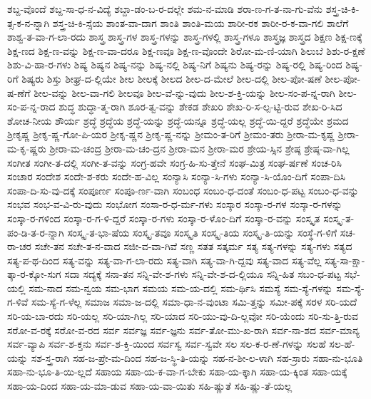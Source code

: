 {ಶಬ್ದ-ವೊಂದೆ
ಶಬ್ದ-ಸಾ-ಧ-ನ-ವಿದ್ಯೆ
ಶಬ್ದಾ-ಡಂ-ಬ-ರ-ದಲ್ಲೇ
ಶಮ-ನ-ಮಾಡಿ
ಶರಾ-ಣ-ಗ-ತ-ನಾ-ಗು-ವೆನು
ಶಸ್ತ್ರ-ಚಿ-ಕಿ-ತ್ಸ-ಕ-ನ-ನ್ನಾಗಿ
ಶಸ್ತ್ರ-ಚಿ-ಕಿ-ಸ್ಸೆಯ
ಶಾಂತ-ವಾ-ದಾಗ
ಶಾಂತಿ
ಶಾಂತಿ-ಮಯ
ಶಾರೀ-ರಕ
ಶಾರೀ-ರ-ಕ-ವಾ-ಗಲಿ
ಶಾಲೆಗೆ
ಶಾಶ್ವ-ತ-ವಾ-ಗ-ಲಾ-ರದು
ಶಾಸ್ತ್ರ
ಶಾಸ್ತ್ರ-ಗಳ
ಶಾಸ್ತ್ರ-ಗಳನ್ನು
ಶಾಸ್ತ್ರ-ಗಳಲ್ಲಿ
ಶಾಸ್ತ್ರ-ಗಳೂ
ಶಾಸ್ತ್ರಜ್ಞ
ಶಾಸ್ತ್ರದ
ಶಿಕ್ಷಣ
ಶಿಕ್ಷ-ಣಕ್ಕೆ
ಶಿಕ್ಷ-ಣದ
ಶಿಕ್ಷ-ಣ-ವನ್ನು
ಶಿಕ್ಷ-ಣ-ವಾ-ದರೂ
ಶಿಕ್ಷ-ಣವೂ
ಶಿಕ್ಷ-ಣ-ವೊಂದೇ
ಶಿರೋ-ಮ-ಣಿ-ಯಾಗಿ
ಶಿಲುಬೆ
ಶಿಶು-ರ-ಕ್ಷಣೆ
ಶಿಶು-ವಿ-ಹಾ-ರ-ಗಳು
ಶಿಷ್ಯ
ಶಿಷ್ಯನ
ಶಿಷ್ಯ-ನನ್ನು
ಶಿಷ್ಯ-ನಲ್ಲಿ
ಶಿಷ್ಯ-ನಿಗೆ
ಶಿಷ್ಯನು
ಶಿಷ್ಯ-ರನ್ನು
ಶಿಷ್ಯ-ರಲ್ಲಿ
ಶಿಷ್ಯ-ರಿಂದ
ಶಿಷ್ಯ-ರಿಗೆ
ಶಿಷ್ಯರು
ಶಿಸ್ತು
ಶೀಘ್ರ-ದ-ಲ್ಲಿಯೇ
ಶೀಲ
ಶೀಲಕ್ಕೆ
ಶೀಲದ
ಶೀಲ-ದ-ಮೇಲೆ
ಶೀಲ-ದಲ್ಲಿ
ಶೀಲ-ಪೋ-ಷಣೆ
ಶೀಲ-ಪೋ-ಷ-ಣೆಗೆ
ಶೀಲ-ವನ್ನು
ಶೀಲ-ವಾ-ಗಲಿ
ಶೀಲವೂ
ಶೀಲ-ವೆ-ನ್ನು-ವುದು
ಶೀಲ-ಶ-ಕ್ತಿ-ಯನ್ನು
ಶೀಲ-ಸಂ-ಪ-ನ್ನ-ರಾಗಿ
ಶೀಲ-ಸಂ-ಪ-ನ್ನ-ರಾದ
ಶುದ್ಧ
ಶುದ್ಧಾ-ತ್ಮ-ರಾಗಿ
ಶೂರ-ತ್ವ-ವನ್ನು
ಶೇಕಡ
ಶೇಖರಿ
ಶೇಖ-ರಿ-ಸ-ಲ್ಪ-ಟ್ಟಿ-ರುವ
ಶೇಖ-ರಿ-ಸಿದ
ಶೋಚ-ನೀಯ
ಶೌರ್ಯ
ಶ್ರದ್ಧೆ
ಶ್ರದ್ಧೆಯ
ಶ್ರದ್ಧೆ-ಯನ್ನು
ಶ್ರದ್ಧೆ-ಯನ್ನೂ
ಶ್ರದ್ಧೆ-ಯಲ್ಲ
ಶ್ರದ್ಧೆ-ಯಿ-ದ್ದರೆ
ಶ್ರದ್ಧೆಯೇ
ಶ್ರಮದ
ಶ್ರೀಕೃಷ್ಣ
ಶ್ರೀಕೃ-ಷ್ಣ-ಗೋ-ಪಿ-ಯರ
ಶ್ರೀಕೃ-ಷ್ಣನ
ಶ್ರೀಕೃ-ಷ್ಣ-ನನ್ನು
ಶ್ರೀಮಂ-ತ-ರಿಗೆ
ಶ್ರೀಮಂ-ತರು
ಶ್ರೀರಾ-ಮ-ಕೃಷ್ಣ
ಶ್ರೀರಾ-ಮ-ಕೃ-ಷ್ಣರು
ಶ್ರೀರಾ-ಮ-ಚಂದ್ರ
ಶ್ರೀರಾ-ಮ-ಚಂ-ದ್ರನ
ಶ್ರೀರಾ-ಮನ
ಶ್ರೀರಾ-ಮರ
ಶ್ರೇಯ-ಸ್ಸಿನ
ಶ್ರೇಷ್ಠ
ಶ್ರೇಷ್ಠ-ವಾ-ಗಿಲ್ಲ
ಸಂಗೀತ
ಸಂಗೀ-ತ-ದಲ್ಲಿ
ಸಂಗೀ-ತ-ವನ್ನು
ಸಂಗ್ರ-ಹವೇ
ಸಂಗ್ರ-ಹಿ-ಸು-ತ್ತೇನೆ
ಸಂಘ-ಮಿತ್ರ
ಸಂಘ-ರ್ಷಣೆ
ಸಂಚ-ರಿಸಿ
ಸಂಚಾರ
ಸಂದೇಶ
ಸಂದೇ-ಶ-ಕರು
ಸಂದೇ-ಹ-ವಿಲ್ಲ
ಸಂನ್ಯಾಸಿ
ಸಂನ್ಯಾ-ಸಿ-ಗಳು
ಸಂನ್ಯಾ-ಸಿ-ಯೊಂ-ದಿಗೆ
ಸಂಪಾ-ದಿಸಿ
ಸಂಪಾ-ದಿ-ಸು-ವು-ದಕ್ಕೆ
ಸಂಪೂರ್ಣ
ಸಂಪೂ-ರ್ಣ-ವಾಗಿ
ಸಂಬಂಧ
ಸಂಬಂ-ಧ-ದಂತೆ
ಸಂಬಂ-ಧ-ಪಟ್ಟ
ಸಂಬಂ-ಧ-ವನ್ನು
ಸಂಭವ
ಸಂಭ-ವ-ವಿ-ರು-ವುದು
ಸಂಭೋಗ
ಸಂಸಾ-ರ-ಧ-ರ್ಮ-ಗಳು
ಸಂಸ್ಕಾರ
ಸಂಸ್ಕಾ-ರ-ಗಳ
ಸಂಸ್ಕಾ-ರ-ಗಳನ್ನು
ಸಂಸ್ಕಾ-ರ-ಗಳಿಂದ
ಸಂಸ್ಕಾ-ರ-ಗ-ಳಿ-ದ್ದರೆ
ಸಂಸ್ಕಾ-ರ-ಗಳು
ಸಂಸ್ಕಾ-ರ-ಳೊಂ-ದಿಗೆ
ಸಂಸ್ಕಾ-ರ-ವನ್ನು
ಸಂಸ್ಕೃತ
ಸಂಸ್ಕೃ-ತ-ಪಂ-ಡಿ-ತ-ರ-ನ್ನಾಗಿ
ಸಂಸ್ಕೃ-ತ-ಭಾ-ಷೆಯ
ಸಂಸ್ಕೃ-ತವೂ
ಸಂಸ್ಕೃತಿ
ಸಂಸ್ಕೃ-ತಿಯ
ಸಂಸ್ಕೃ-ತಿ-ಯನ್ನು
ಸಂಸ್ಥೆ-ಗ-ಳಿಗೆ
ಸಚ-ರಾ-ಚರ
ಸಚೇ-ತನ
ಸಚೇ-ತ-ನ-ವಾದ
ಸಜೀ-ವ-ವಾ-ಗಿವೆ
ಸಣ್ಣ
ಸತತ
ಸತ್ಕರ್ಮ
ಸತ್ಯ
ಸತ್ಯ-ಗಳನ್ನು
ಸತ್ಯ-ಗಳು
ಸತ್ಯದ
ಸತ್ಯ-ಪ-ಥ-ದಿಂದ
ಸತ್ಯ-ವನ್ನು
ಸತ್ಯ-ವಾ-ಗ-ಲಾ-ರದು
ಸತ್ಯ-ವಾಗಿ
ಸತ್ಯ-ವಾ-ಗಿ-ದ್ದವು
ಸತ್ಯ-ವಾದ
ಸತ್ಯ-ವೆಲ್ಲ
ಸತ್ಯ-ಸಾ-ಕ್ಷಾ-ತ್ಕಾ-ರ-ಕ್ಕೋ-ಸುಗ
ಸದಾ
ಸದ್ಯಕ್ಕೆ
ಸನಾ-ತನ
ಸನ್ನಿ-ವೇ-ಶ-ಗಳು
ಸನ್ನಿ-ವೇ-ಶ-ದ-ಲ್ಲಿಯೂ
ಸನ್ನಿ-ಹಿತ
ಸಬಂ-ಧ-ಪಟ್ಟ
ಸಭೆ-ಯಲ್ಲಿ
ಸಮ-ನಾದ
ಸಮ-ನ್ವಯ
ಸಮ-ಭಾಗ
ಸಮಯ
ಸಮ-ಯ-ದಲ್ಲಿ
ಸಮ-ರ್ಥಿಸಿ
ಸಮಸ್ಯೆ
ಸಮ-ಸ್ಯೆ-ಗಳನ್ನು
ಸಮ-ಸ್ಯೆ-ಗ-ಳಿವೆ
ಸಮ-ಸ್ಯೆ-ಗ-ಳೆಲ್ಲ
ಸಮಾಜ
ಸಮಾ-ಜ-ದಲ್ಲಿ
ಸಮಾ-ಧಾ-ನ-ವುಂಟಾ
ಸಮಿ-ತ್ತನ್ನು
ಸಮೀ-ಪಕ್ಕೆ
ಸರಳ
ಸರಿ-ಯದೆ
ಸರಿ-ಯ-ಬಾ-ರದು
ಸರಿ-ಯಲ್ಲ
ಸರಿ-ಯಾ-ಗಿಲ್ಲ
ಸರಿ-ಯಾದ
ಸರಿ-ಯು-ವು-ದಿ-ಲ್ಲವೋ
ಸರಿ-ಯೆಂದು
ಸರಿ-ಸು-ತ್ತಿ-ರುವ
ಸರೋ-ವ-ರಕ್ಕೆ
ಸರೋ-ವ-ರದ
ಸರ್ವ
ಸರ್ವಜ್ಞ
ಸರ್ವ-ಜ್ಞನು
ಸರ್ವ-ತೋ-ಮು-ಖ-ರಾಗಿ
ಸರ್ವ-ನಾ-ಶದ
ಸರ್ವ-ಮಾನ್ಯ
ಸರ್ವ-ವ್ಯಾಪಿ
ಸರ್ವ-ಶ-ಕ್ತನು
ಸರ್ವ-ಶ-ಕ್ತಿ-ಯಿಂದ
ಸರ್ವಸ್ವ
ಸರ್ವ-ಸ್ವವೇ
ಸಲ
ಸಲ-ಕ-ರ-ಣೆ-ಗಳನ್ನು
ಸಲಹೆ
ಸಲ-ಹೆ-ಯನ್ನು
ಸಶ-ಸ್ತ್ರ-ರಾಗಿ
ಸಹ-ಜ-ಪ್ರೇ-ಮ-ದಿಂದ
ಸಹ-ಜ-ಸ್ಥಿ-ತಿ-ಯನ್ನು
ಸಹ-ನ-ಶೀ-ಲ-ಳಾಗಿ
ಸಹ-ಸ್ರಾರು
ಸಹಾ-ನು-ಭೂತಿ
ಸಹಾ-ನು-ಭೂ-ತಿ-ಯಿ-ಲ್ಲದೆ
ಸಹಾಯ
ಸಹಾ-ಯ-ಕ-ವಾ-ಗ-ಬೇಕು
ಸಹಾ-ಯ-ಕ್ಕಾಗಿ
ಸಹಾ-ಯ-ಕ್ಕಿಂತ
ಸಹಾ-ಯಕ್ಕೆ
ಸಹಾ-ಯ-ದಿಂದ
ಸಹಾ-ಯ-ಮಾ-ಡುವ
ಸಹಾ-ಯ-ವಾ-ಯಿತು
ಸಹಿ-ಷ್ಣುತೆ
ಸಹಿ-ಷ್ಣು-ತೆ-ಯಲ್ಲ
}
